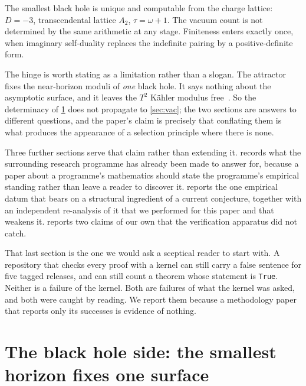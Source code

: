 \documentclass[11pt,a4paper]{article}
\theoremstyle{remark}
\begin{document}
\begin{headlinebox}
The smallest black hole is unique and computable from the charge lattice: $D=-3$, transcendental lattice $A_2$,
$\tau=\omega+1$. The vacuum count is not determined by the same arithmetic at any stage. Finiteness enters
exactly once, when imaginary self-duality replaces the indefinite pairing by a positive-definite form.
\end{headlinebox}

The hinge is worth stating as a limitation rather than a slogan. The attractor fixes the near-horizon moduli of
\emph{one} black hole. It says nothing about the asymptotic surface, and it leaves the $T^2$ K\"ahler modulus
free~\cite{Moore1998}. So the determinacy of \cref{sec:bh} does not propagate to \cref{sec:vac}; the two sections
are answers to different questions, and the paper's claim is precisely that conflating them is what produces the
appearance of a selection principle where there is none.

Three further sections serve that claim rather than extending it.  records what the surrounding
research programme has already been made to answer for, because a paper about a programme's mathematics should
state the programme's empirical standing rather than leave a reader to discover it.  reports the
one empirical datum that bears on a structural ingredient of a current conjecture, together with an independent
re-analysis of it that we performed for this paper and that weakens it.  reports two claims of
our own that the verification apparatus did not catch.

That last section is the one we would ask a sceptical reader to start with. A repository that checks every proof
with a kernel can still carry a false sentence for five tagged releases, and can still count a theorem whose
statement is \texttt{True}. Neither is a failure of the kernel. Both are failures of what the kernel was asked,
and both were caught by reading. We report them because a methodology paper that reports only its successes is
evidence of nothing.


\section{The black hole side: the smallest horizon fixes one surface}\label{sec:bh}
\end{document}
